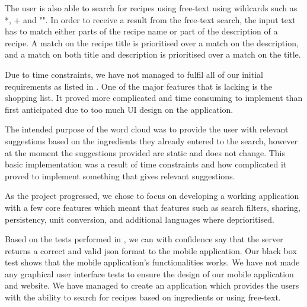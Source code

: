 The user is also able to search for recipes using free-text using wildcards such as *, + and "". In order to receive a result from the free-text search, the input text has to match either parts of the recipe name or part of the description of a recipe. A match on the recipe title is prioritised over a match on the description, and a match on both title and description is prioritised over a match on the title.

Due to time constraints, we have not managed to fulfil all of our initial requirements as listed in . One of the major features that is lacking is the shopping list. It proved more complicated and time consuming to implement than first anticipated due to too much UI design on the application.

The intended purpose of the word cloud was to provide the user with relevant suggestions based on the ingredients they already entered to the search, however at the moment the suggestions provided are static and does not change. This basic implementation was a result of time constraints and how complicated it proved to implement something that gives relevant suggestions. 

As the project progressed, we chose to focus on developing a working application with a few core features which meant that features such as search filters, sharing, persistency, unit conversion, and additional languages where deprioritised. 

Based on the tests performed in , we can with confidence say that the server returns a correct and valid \ac{json} format to the mobile application. Our black box test shows that the mobile application's functionalities works. We have not made any graphical user interface tests to ensure the design of our mobile application and website. We have managed to create an application which provides the users with the ability to search for recipes based on ingredients or using free-text.